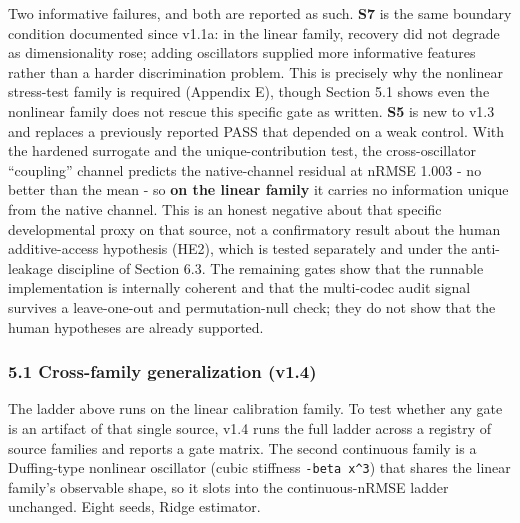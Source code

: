 \documentclass[
  11pt,
]{article}
\begin{document}
Two informative failures, and both are reported as
such. \textbf{S7} is the same boundary condition
documented since v1.1a: in the linear family, recovery
did not degrade as dimensionality rose; adding
oscillators supplied more informative features rather
than a harder discrimination problem. This is precisely
why the nonlinear stress-test family is required
(Appendix E), though Section 5.1 shows even the
nonlinear family does not rescue this specific gate as
written. \textbf{S5} is new to v1.3 and replaces a
previously reported PASS that depended on a weak
control. With the hardened surrogate and the
unique-contribution test, the cross-oscillator
``coupling'' channel predicts the native-channel
residual at nRMSE 1.003 - no better than the mean - so
\textbf{on the linear family} it carries no information
unique from the native channel. This is an honest
negative about that specific developmental proxy on
that source, not a confirmatory result about the human
additive-access hypothesis (HE2), which is tested
separately and under the anti-leakage discipline of
Section 6.3. The remaining gates show that the runnable
implementation is internally coherent and that the
multi-codec audit signal survives a leave-one-out and
permutation-null check; they do not show that the human
hypotheses are already supported.

\subsubsection{5.1 Cross-family generalization
(v1.4)}\label{cross-family-generalization-v1.4}

The ladder above runs on the linear calibration family.
To test whether any gate is an artifact of that single
source, v1.4 runs the full ladder across a registry of
source families and reports a gate matrix. The second
continuous family is a Duffing-type nonlinear
oscillator (cubic stiffness \texttt{-beta\ x\^{}3})
that shares the linear family's observable shape, so it
slots into the continuous-nRMSE ladder unchanged. Eight
seeds, Ridge estimator.
\end{document}
